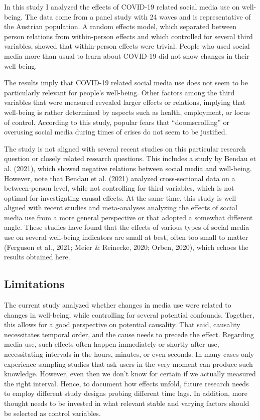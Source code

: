 \documentclass[
  english,
  man,mask,floatsintext]{apa6}
\begin{document}
In this study I analyzed the effects of COVID-19 related social media use on well-being.
The data come from a panel study with 24 waves and is representative of the Austrian population.
A random effects model, which separated between person relations from within-person effects and which controlled for several third variables, showed that within-person effects were trivial.
People who used social media more than usual to learn about COVID-19 did not show changes in their well-being.

The results imply that COVID-19 related social media use does not seem to be particularly relevant for people's well-being.
Other factors among the third variables that were measured revealed larger effects or relations, implying that well-being is rather determined by aspects such as health, employment, or locus of control.
According to this study, popular fears that ``doomscrolling'' or overusing social media during times of crises do not seem to be justified.

The study is not aligned with several recent studies on this particular research question or closely related research questions.
This includes a study by Bendau et al. (2021), which showed negative relations between social media and well-being.
However, note that Bendau et al. (2021) analyzed cross-sectional data on a between-person level, while not controlling for third variables, which is not optimal for investigating causal effects.
At the same time, this study is well-aligned with recent studies and meta-analyses analyzing the effects of social media use from a more general perspective or that adopted a somewhat different angle.
These studies have found that the effects of various types of social media use on several well-being indicators are small at best, often too small to matter (Ferguson et al., 2021; Meier \& Reinecke, 2020; Orben, 2020), which echoes the results obtained here.

\hypertarget{limitations}{%
\subsection{Limitations}\label{limitations}}

The current study analyzed whether changes in media use were related to changes in well-being, while controlling for several potential confounds.
Together, this allows for a good perspective on potential causality.
That said, causality necessitates temporal order, and the cause needs to precede the effect.
Regarding media use, such effects often happen immediately or shortly after use, necessitating intervals in the hours, minutes, or even seconds.
In many cases only experience sampling studies that ask users in the very moment can produce such knowledge.
However, even then we don't know for certain if we actually measured the right interval.
Hence, to document how effects unfold, future research needs to employ different study designs probing different time lags.
In addition, more thought needs to be invested in what relevant stable and varying factors should be selected as control variables.
\end{document}
